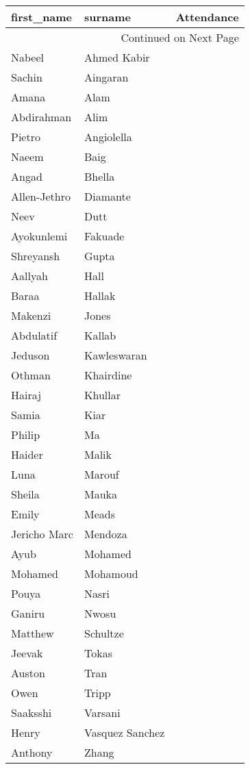 \documentclass{article}%
\begin{document}
%
\normalsize%
\begin{longtable}{l l l}%
\hline%
first\_name&surname&Attendance\\%
\hline%
\endhead%
\hline%
\multicolumn{3}{r}{Continued on Next Page}\\%
\hline%
\endfoot%
\hline%
\endlastfoot%
 Nabeel& Ahmed Kabir&\\%
 Sachin& Aingaran&\\%
 Amana& Alam&\\%
 Abdirahman& Alim&\\%
 Pietro& Angiolella&\\%
 Naeem& Baig&\\%
 Angad& Bhella&\\%
 Allen{-}Jethro& Diamante&\\%
 Neev& Dutt&\\%
 Ayokunlemi& Fakuade&\\%
 Shreyansh& Gupta&\\%
 Aallyah& Hall&\\%
 Baraa& Hallak&\\%
 Makenzi& Jones&\\%
 Abdulatif& Kallab&\\%
 Jeduson& Kawleswaran&\\%
 Othman& Khairdine&\\%
 Hairaj& Khullar&\\%
 Samia& Kiar&\\%
 Philip& Ma&\\%
 Haider& Malik&\\%
 Luna& Marouf&\\%
 Sheila& Mauka&\\%
 Emily& Meads&\\%
 Jericho Marc& Mendoza&\\%
 Ayub& Mohamed&\\%
 Mohamed& Mohamoud&\\%
 Pouya& Nasri&\\%
 Ganiru& Nwosu&\\%
 Matthew& Schultze&\\%
 Jeevak& Tokas&\\%
 Auston& Tran&\\%
 Owen& Tripp&\\%
 Saaksshi& Varsani&\\%
 Henry& Vasquez Sanchez&\\%
 Anthony& Zhang&\\%
\end{longtable}%
\end{document}

